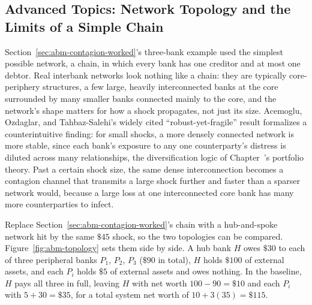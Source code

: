 \documentclass[../ai_in_finance]{subfiles}
\begin{document}
\subsection{Advanced Topics: Network Topology and the Limits of a Simple Chain}
\label{sec:abm-advanced}

Section~\ref{sec:abm-contagion-worked}'s three-bank example used the simplest possible network, a chain, in which every bank has one creditor and at most one debtor. Real interbank networks look nothing like a chain: they are typically core-periphery structures, a few large, heavily interconnected banks at the core surrounded by many smaller banks connected mainly to the core, and the network's shape matters for how a shock propagates, not just its size. Acemoglu, Ozdaglar, and Tahbaz-Salehi's widely cited ``robust-yet-fragile'' result formalizes a counterintuitive finding: for small shocks, a more densely connected network is more stable, since each bank's exposure to any one counterparty's distress is diluted across many relationships, the diversification logic of Chapter~'s portfolio theory. Past a certain shock size, the same dense interconnection becomes a contagion channel that transmits a large shock further and faster than a sparser network would, because a large loss at one interconnected core bank has many more counterparties to infect.

\label{sec:abm-topology-worked}

Replace Section~\ref{sec:abm-contagion-worked}'s chain with a hub-and-spoke network hit by the same $\$45$ shock, so the two topologies can be compared. Figure~\ref{fig:abm-topology} sets them side by side. A hub bank $H$ owes $\$30$ to each of three peripheral banks $P_1$, $P_2$, $P_3$ ($\$90$ in total), $H$ holds $\$100$ of external assets, and each $P_i$ holds $\$5$ of external assets and owes nothing. In the baseline, $H$ pays all three in full, leaving $H$ with net worth $100-90=\$10$ and each $P_i$ with $5+30=\$35$, for a total system net worth of $10+3(35)=\$115$.
\end{document}
